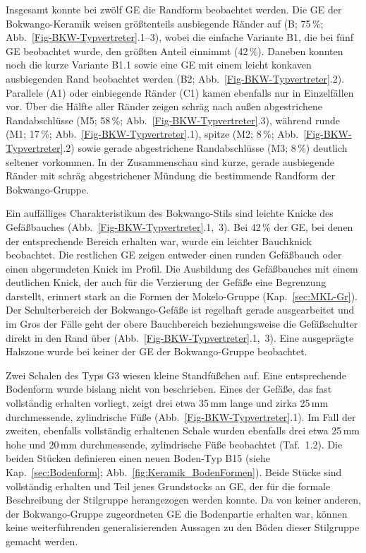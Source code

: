 Insgesamt konnte bei zwölf GE die Randform beobachtet werden. Die GE der Bokwango-Keramik weisen größtenteils ausbiegende Ränder auf (B; 75\,\%; Abb.~\ref{Fig-BKW-Typvertreter}.1--3), wobei die einfache Variante B1, die bei fünf GE beobachtet wurde, den größten Anteil einnimmt (42\,\%). Daneben konnten noch die kurze Variante B1.1 sowie eine GE mit einem leicht konkaven ausbiegenden Rand beobachtet werden (B2; Abb.~\ref{Fig-BKW-Typvertreter}.2). Parallele (A1) oder einbiegende Ränder (C1) kamen ebenfalls nur in Einzelfällen vor. Über die Hälfte aller Ränder zeigen schräg nach außen abgestrichene Randabschlüsse (M5; 58\,\%; Abb.~\ref{Fig-BKW-Typvertreter}.3), während runde (M1; 17\,\%; Abb.~\ref{Fig-BKW-Typvertreter}.1), spitze (M2; 8\,\%; Abb.~\ref{Fig-BKW-Typvertreter}.2) sowie gerade abgestrichene Randabschlüsse (M3; 8\,\%) deutlich seltener vorkommen. In der Zusammenschau sind kurze, gerade ausbiegende Ränder mit schräg abgestrichener Mündung die bestimmende Randform der Bokwango-Gruppe.

Ein auffälliges Charakteristikum des Bokwango-Stils sind leichte Knicke des Gefäßbauches (Abb.~\ref{Fig-BKW-Typvertreter}.1,~3). Bei 42\,\% der GE, bei denen der entsprechende Bereich erhalten war, wurde ein leichter Bauchknick beobachtet. Die restlichen GE zeigen entweder einen runden Gefäßbauch oder einen abgerundeten Knick im Profil. Die Ausbildung des Gefäßbauches mit einem deutlichen Knick, der auch für die Verzierung der Gefäße eine Begrenzung darstellt, erinnert stark an die Formen der Mokelo-Gruppe (Kap.~\ref{sec:MKL-Gr}). Der Schulterbereich der Bokwango-Gefäße ist regelhaft gerade ausgearbeitet und im Gros der Fälle geht der obere Bauchbereich beziehungsweise die Gefäßschulter direkt in den Rand über (Abb.~\ref{Fig-BKW-Typvertreter}.1,~3). Eine ausgeprägte Halszone wurde bei keiner der GE der Bokwango-Gruppe beobachtet. 

Zwei Schalen des Typs G3 wiesen kleine Standfüßchen auf. Eine entsprechende Bodenform wurde bislang nicht von \textcite[440~Taf.~6]{Wotzka.1995} beschrieben. Eines der Gefäße, das fast vollständig erhalten vorliegt, zeigt drei etwa 35\,mm lange und zirka 25\,mm durchmessende, zylindrische Füße (Abb.~\ref{Fig-BKW-Typvertreter}.1). Im Fall der zweiten, ebenfalls vollständig erhaltenen Schale wurden ebenfalls drei etwa 25\,mm hohe und 20\,mm durchmessende, zylindrische Füße beobachtet (Taf.~1.2). Die beiden Stücken definieren einen neuen Boden-Typ B15 (siehe Kap.~\ref{sec:Bodenform}; Abb.~\ref{fig:Keramik_BodenFormen}). Beide Stücke sind vollständig erhalten und Teil jenes Grundstocks an GE, der für die formale Beschreibung der Stilgruppe herangezogen werden konnte. Da von keiner anderen, der Bokwango-Gruppe zugeordneten GE die Bodenpartie erhalten war, können keine weiterführenden generalisierenden Aussagen zu den Böden dieser Stilgruppe gemacht werden.

